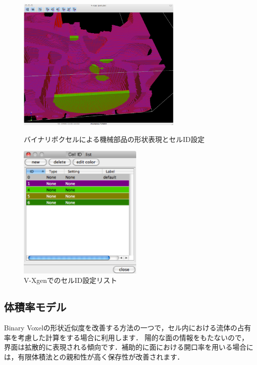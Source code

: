 \begin{figure}[htbp]
\begin{minipage}{.6\textwidth}
\begin{center}
\includegraphics[width=8cm,clip]{eport.eps}
\end{center}
\caption{バイナリボクセルによる機械部品の形状表現とセルID設定}
\label{fig:Eport binary voxel}
\end{minipage} \hfill
\begin{minipage}{.38\textwidth}
\begin{center}
\includegraphics[width=6cm,clip]{Mlist.eps}
\end{center}
\caption{V-XgenでのセルID設定リスト}
\label{fig:ID set on V-Xgen}
\end{minipage}
\end{figure}

%
\subsection{体積率モデル}
Binary Voxelの形状近似度を改善する方法の一つで，セル内における流体の占有率を考慮した計算をする場合に利用します．
陽的な面の情報をもたないので，界面は拡散的に表現される傾向です．補助的に面における開口率を用いる場合には，有限体積法との親和性が高く保存性が改善されます．
%
